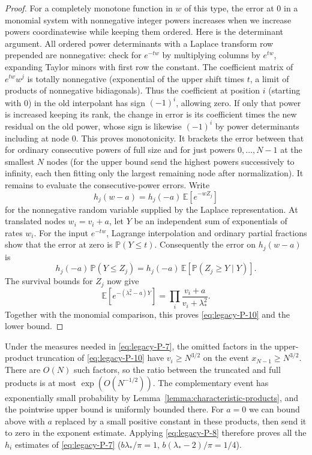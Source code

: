 \begin{proof}
For a completely monotone function in $w$ of this type, the error at 0 in a monomial system with nonnegative integer powers increases when we increase powers coordinatewise while keeping them ordered. Here is the determinant argument. All ordered power determinants with a Laplace transform row prepended are nonnegative: check for $e^{-tw}$ by multiplying columns by $e^{tw}$, expanding Taylor minors with first row the constant. The coefficient matrix of $e^{tw}w^j$ is totally nonnegative (exponential of the upper shift times $t$, a limit of products of nonnegative bidiagonals). Thus the coefficient at position $i$ (starting with 0) in the old interpolant has sign $(-1)^i$, allowing zero. If only that power is increased keeping its rank, the change in error is its coefficient times the new residual on the old power, whose sign is likewise $(-1)^i$ by power determinants including at node 0. This proves monotonicity. It brackets the error between that for ordinary consecutive powers of full size and for just powers $0,\ldots,N-1$ at the smallest $N$ nodes (for the upper bound send the highest powers successively to infinity, each then fitting only the largest remaining node after normalization). It remains to evaluate the consecutive-power errors. Write
\[
 h_j(w-a)=h_j(-a)\,\mathbb E[e^{-wZ_j}]
\]
for the nonnegative random variable supplied by the Laplace representation. At translated nodes $w_i=v_i+a$, let $Y$ be an independent sum of exponentials of rates $w_i$. For the input $e^{-tw}$, Lagrange interpolation and ordinary partial fractions show that the error at zero is $\mathbb P(Y\le t)$. Consequently the error on $h_j(w-a)$ is
\[
 h_j(-a)\,\mathbb P(Y\le Z_j)
 =h_j(-a)\,\mathbb E[\mathbb P(Z_j\ge Y\mid Y)].
\]
The survival bounds for $Z_j$ now give
\[
 \mathbb E[e^{-(\lambda_*^2-a)Y}]
 =\prod_i\frac{v_i+a}{v_i+\lambda_*^2}.
\]
Together with the monomial comparison, this proves \eqref{eq:legacy-P-10} and the lower bound.
\end{proof}

Under the measures needed in \eqref{eq:legacy-P-7}, the omitted factors in the upper-product truncation of \eqref{eq:legacy-P-10} have $v_i\ge N^{3/2}$ on the event $x_{N-1}\ge N^{3/2}$. There are $O(N)$ such factors, so the ratio between the truncated and full products is at most $\exp(O(N^{-1/2}))$. The complementary event has exponentially small probability by Lemma~\ref{lemma:characteristic-products}, and the pointwise upper bound is uniformly bounded there. For $a=0$ we can bound above with $a$ replaced by a small positive constant in these products, then send it to zero in the exponent estimate. Applying \eqref{eq:legacy-P-8} therefore proves all the $h_i$ estimates of \eqref{eq:legacy-P-7} ($b\lambda_*/\pi=1$, $b(\lambda_*-2)/\pi=1/4$).

